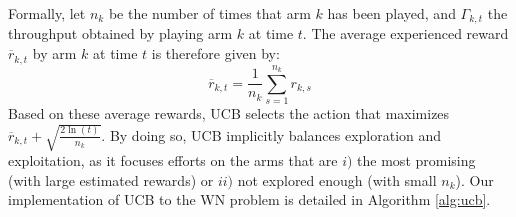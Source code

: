 \documentclass[10pt,journal,compsoc]{IEEEtran}
\begin{document}
	Formally, let $n_k$ be the number of times that arm $k$ has been played, and $\Gamma_{k,t}$ the throughput obtained by playing arm $k$ at time $t$. The average experienced reward $\overline{r}_{k,t}$ by arm $k$ at time $t$ is therefore given by:
	\begin{equation}
	\label{eq:ucb}
	\overline{r}_{k,t} = \frac{1}{n_k} \sum_{s=1}^{n_k} r_{k,s}
	\nonumber
	\end{equation}	
	Based on these average rewards, UCB selects the action that maximizes $\overline{r}_{k,t} + \sqrt{\frac{2 \ln(t)}{n_k}}$. By doing so, UCB implicitly balances exploration and exploitation, as it focuses efforts on the arms that are $i)$ the most promising (with large estimated rewards) or $ii)$ not explored enough (with small $n_k$). Our implementation of UCB to the WN problem is detailed in Algorithm \ref{alg:ucb}.	
	
\end{document}
